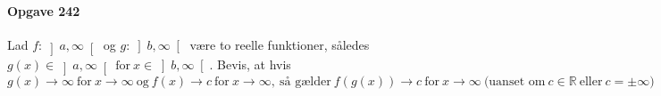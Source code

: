 \documentclass[12pt]{article}
\begin{document}
\maketitle

\paragraph{Opgave 242} Lad $f: \left]a, \infty \right[$ og $g: \left] b, \infty \right[$ være to reelle funktioner, således $g(x) \in \left]a, \infty \right[ \ \text{for} \ x \in \left] b, \infty \right[$. Bevis, at hvis $g(x)\rightarrow \infty \ \text{for} \ x \rightarrow \infty \ \text{og} \ f(x)\rightarrow c \ \text{for} \ x \rightarrow \infty, \ \text{så gælder} \ f\left(g(x)\right) \rightarrow c \ \text{for} \ x \rightarrow \infty \ \text{(uanset om} \ c \in \mathbb{R} \ \text{eller} \ c = \pm \infty)$
\end{document}
